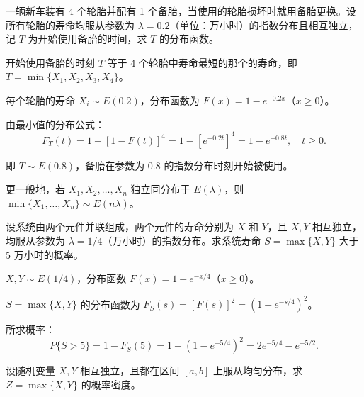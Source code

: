 \documentclass[lang=cn,11pt]{elegantbook}
\begin{document}
\begin{exercise}\label{exer:3-9}
一辆新车装有 4 个轮胎并配有 1 个备胎，当使用的轮胎损坏时就用备胎更换。设所有轮胎的寿命均服从参数为 $\lambda = 0.2$（单位：万小时）的指数分布且相互独立，记 $T$ 为开始使用备胎的时间，求 $T$ 的分布函数。
\end{exercise}

\begin{solution}
开始使用备胎的时刻 $T$ 等于 4 个轮胎中寿命最短的那个的寿命，即 $T = \min\{X_1, X_2, X_3, X_4\}$。

每个轮胎的寿命 $X_i \sim E(0.2)$，分布函数为 $F(x) = 1 - e^{-0.2x}$（$x \geqslant 0$）。

由最小值的分布公式：
\[
F_T(t) = 1 - [1 - F(t)]^4 = 1 - [e^{-0.2t}]^4 = 1 - e^{-0.8t}, \quad t \geqslant 0.
\]

即 $T \sim E(0.8)$，备胎在参数为 $0.8$ 的指数分布时刻开始被使用。

\begin{note}
更一般地，若 $X_1, X_2, \dots, X_n$ 独立同分布于 $E(\lambda)$，则 $\min\{X_1, \dots, X_n\} \sim E(n\lambda)$。
\end{note}
\end{solution}

\begin{exercise}[并联系统最大值分布] \label{exer:3-10}
设系统由两个元件并联组成，两个元件的寿命分别为 $X$ 和 $Y$，且 $X, Y$ 相互独立，均服从参数为 $\lambda = 1/4$（万小时）的指数分布。求系统寿命 $S = \max\{X, Y\}$ 大于 5 万小时的概率。
\end{exercise}

\begin{solution}
$X, Y \sim E(1/4)$，分布函数 $F(x) = 1 - e^{-x/4}$（$x \geqslant 0$）。

$S = \max\{X, Y\}$ 的分布函数为 $F_S(s) = [F(s)]^2 = (1-e^{-s/4})^2$。

所求概率：
\[
P\{S > 5\} = 1 - F_S(5) = 1 - (1 - e^{-5/4})^2 = 2e^{-5/4} - e^{-5/2}.
\]
\end{solution}

\begin{exercise}[均匀分布最大值密度] \label{exer:3-10b}
设随机变量 $X, Y$ 相互独立，且都在区间 $[a, b]$ 上服从均匀分布，求 $Z = \max\{X, Y\}$ 的概率密度。
\end{exercise}
\end{document}
